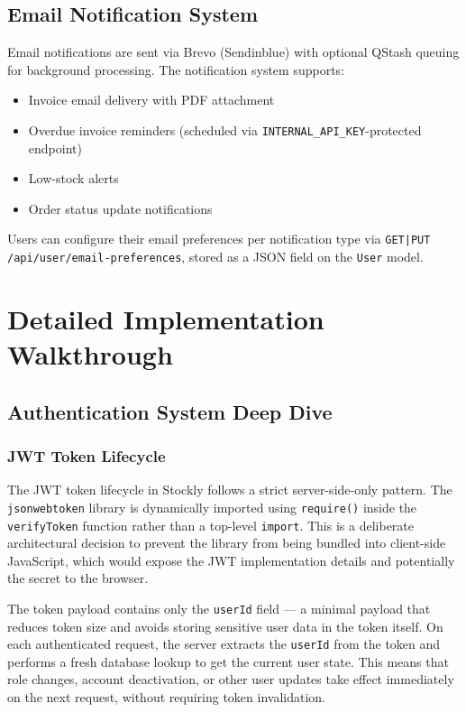 \documentclass[12pt,a4paper]{report}
\begin{document}
\section{Email Notification System}

Email notifications are sent via Brevo (Sendinblue) with optional QStash queuing for background processing. The notification system supports:
\begin{itemize}[leftmargin=1.5em]
  \item Invoice email delivery with PDF attachment
  \item Overdue invoice reminders (scheduled via \texttt{INTERNAL\_API\_KEY}-protected endpoint)
  \item Low-stock alerts
  \item Order status update notifications
\end{itemize}

Users can configure their email preferences per notification type via \texttt{GET|PUT /api/user/email-preferences}, stored as a JSON field on the \texttt{User} model.


\chapter{Detailed Implementation Walkthrough}
\section{Authentication System Deep Dive}

\subsection{JWT Token Lifecycle}

The JWT token lifecycle in Stockly follows a strict server-side-only pattern. The \texttt{jsonwebtoken} library is dynamically imported using \texttt{require()} inside the \texttt{verifyToken} function rather than a top-level \texttt{import}. This is a deliberate architectural decision to prevent the library from being bundled into client-side JavaScript, which would expose the JWT implementation details and potentially the secret to the browser.

The token payload contains only the \texttt{userId} field --- a minimal payload that reduces token size and avoids storing sensitive user data in the token itself. On each authenticated request, the server extracts the \texttt{userId} from the token and performs a fresh database lookup to get the current user state. This means that role changes, account deactivation, or other user updates take effect immediately on the next request, without requiring token invalidation.
\end{document}
